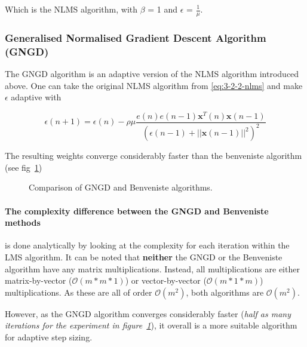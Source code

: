 \documentclass[main.tex]{subfiles}
\begin{document}
Which is the NLMS algorithm, with $\beta$ = 1 and $\epsilon$ = $\frac{1}{\mu}$.



\subsubsection{Generalised Normalised Gradient Descent Algorithm (GNGD)}

The GNGD algorithm is an adaptive version of the NLMS algorithm introduced above. One can take the original NLMS algorithm from \ref{eq:3-2-2-nlms} and make $\epsilon$ adaptive with

\begin{equation}
\epsilon(n+1) = \epsilon(n) - \rho\mu\frac{e(n)e(n-1)\textbf{x}^T(n)\textbf{x}(n-1)}{(\epsilon(n-1)+||\textbf{x}(n-1)||^2)^2}
\end{equation}

The resulting weights converge considerably faster than the benveniste algorithm (see fig~\ref{fig:q3_2_c})

\begin{figure}[H]
	\centering 
	\resizebox{0.7\textwidth}{!}{}
	\caption{Comparison of GNGD and Benveniste algorithms.}
	\label{fig:q3_2_c}
\end{figure}

\paragraph{The complexity difference between the GNGD and Benveniste methods} is done analytically by looking at the complexity for each iteration within the LMS algorithm. It can be noted that \textbf{neither} the GNGD or the Benveniste algorithm have any matrix multiplications. Instead, all multiplications are either matrix-by-vector ($\mathcal{O}(m*m*1)$) or vector-by-vector ($\mathcal{O}(m*1*m)$) multiplications. As these are all of order $\mathcal{O}(m^2)$, both algorithms are $\mathcal{O}(m^2)$.

However, as the GNGD algorithm converges considerably faster (\textit{half as many iterations for the experiment in figure~\ref{fig:q3_2_c}}), it overall is a more suitable algorithm for adaptive step sizing.
\end{document}
